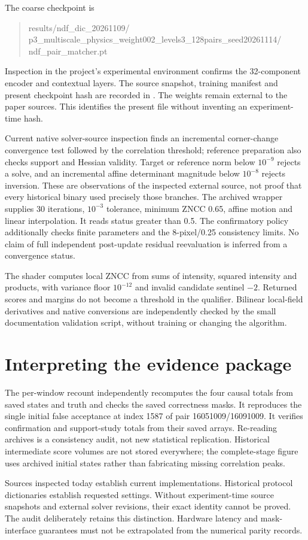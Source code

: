 \documentclass[11pt,a4paper]{article}
\begin{document}
The coarse checkpoint is
\begin{quote}\small\ttfamily
results/ndf\_dic\_20261109/\\
p3\_multiscale\_physics\_weight002\_levels3\_128pairs\_seed20261114/\\
ndf\_pair\_matcher.pt
\end{quote}
Inspection in the project's experimental environment confirms the 32-component encoder and contextual layers. The source snapshot, training manifest and present checkpoint hash are recorded in . The weights remain external to the paper sources. This identifies the present file without inventing an experiment-time hash.

Current native solver-source inspection finds an incremental corner-change convergence test followed by the correlation threshold; reference preparation also checks support and Hessian validity. Target or reference norm below $10^{-9}$ rejects a solve, and an incremental affine determinant magnitude below $10^{-8}$ rejects inversion. These are observations of the inspected external source, not proof that every historical binary used precisely those branches. The archived wrapper supplies 30 iterations, $10^{-3}$ tolerance, minimum ZNCC 0.65, affine motion and linear interpolation. It reads status greater than 0.5. The confirmatory policy additionally checks finite parameters and the 8-pixel/0.25 consistency limits. No claim of full independent post-update residual reevaluation is inferred from a convergence status.

The shader computes local ZNCC from sums of intensity, squared intensity and products, with variance floor $10^{-12}$ and invalid candidate sentinel $-2$. Returned scores and margins do not become a threshold in the qualifier. Bilinear local-field derivatives and native conversions are independently checked by the small documentation validation script, without training or changing the algorithm.

\section{Interpreting the evidence package}
The per-window recount independently recomputes the four causal totals from saved states and truth and checks the saved correctness masks. It reproduces the single initial false acceptance at index 1587 of pair 16051009/16091009. It verifies confirmation and support-study totals from their saved arrays. Re-reading archives is a consistency audit, not new statistical replication. Historical intermediate score volumes are not stored everywhere; the complete-stage figure uses archived initial states rather than fabricating missing correlation peaks.

Sources inspected today establish current implementations. Historical protocol dictionaries establish requested settings. Without experiment-time source snapshots and external solver revisions, their exact identity cannot be proved. The audit deliberately retains this distinction. Hardware latency and mask-interface guarantees must not be extrapolated from the numerical parity records.

\end{document}
